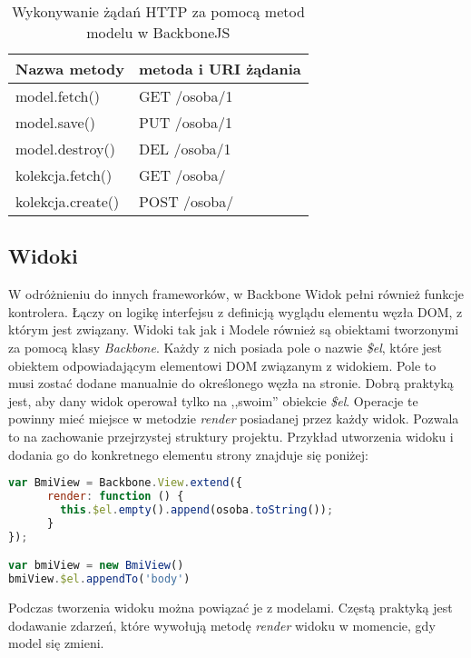 \begin{table}[h]
	\caption{Wykonywanie żądań HTTP za pomocą metod modelu w BackboneJS}
	\label{tab:heading-styles}
	\begin{tabularx}{\textwidth}{|X|X|}
		\hline
		Nazwa metody 						& metoda i URI żądania 	\\ 
		\hline
		model.fetch()		 				& GET /osoba/1 	\\ 
		\hline
		model.save()						& PUT /osoba/1  \\ 
		\hline
		model.destroy() 					& DEL /osoba/1 \\ 
		\hline
		kolekcja.fetch()					& GET /osoba/  \\ 
		\hline
		kolekcja.create() 					& POST /osoba/ \\ 
		\hline
	\end{tabularx}
\end{table}


\subsection{Widoki}
W odróżnieniu do innych frameworków, w Backbone Widok pełni również funkcje kontrolera. Łączy on logikę interfejsu z definicją wyglądu elementu węzła DOM, z którym jest związany. Widoki tak jak i Modele również są obiektami tworzonymi za pomocą klasy \textit{Backbone}. Każdy z nich posiada pole o nazwie \textit{\$el}, które jest obiektem odpowiadającym elementowi DOM związanym z widokiem. Pole to musi zostać dodane manualnie do określonego węzła na stronie. Dobrą praktyką jest, aby dany widok operował tylko na ,,swoim'' obiekcie \textit{\$el}. Operacje te powinny mieć miejsce w metodzie \textit{render} posiadanej przez każdy widok. Pozwala to na zachowanie przejrzystej struktury projektu. Przykład utworzenia widoku i dodania go do konkretnego elementu strony znajduje się poniżej:

\begin{lstlisting}[language=JavaScript]
var BmiView = Backbone.View.extend({ 
	  render: function () {
	  	this.$el.empty().append(osoba.toString());
  	  }
});

var bmiView = new BmiView()
bmiView.$el.appendTo('body')
\end{lstlisting}

Podczas tworzenia widoku można powiązać je z modelami. Częstą praktyką jest dodawanie zdarzeń, które wywołują metodę \textit{render} widoku w momencie, gdy model się zmieni.



